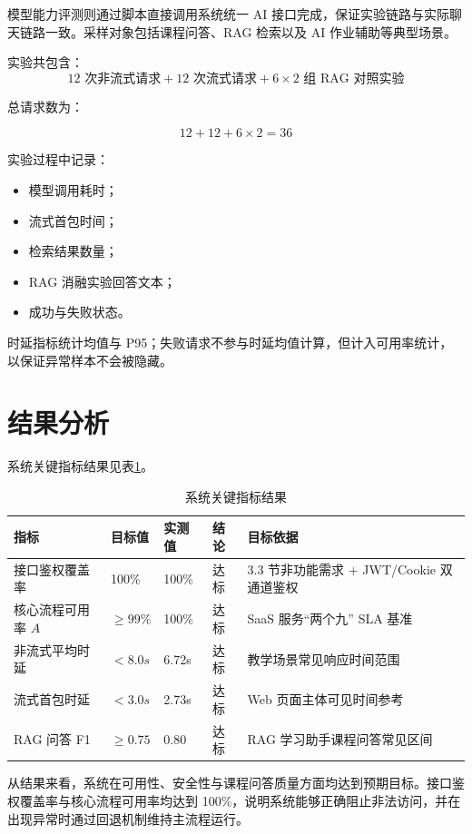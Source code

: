 \documentclass[12pt,a4paper,oneside]{ctexbook}
\numberwithin{equation}{chapter}
\begin{document}
模型能力评测则通过脚本直接调用系统统一 AI 接口完成，保证实验链路与实际聊天链路一致。采样对象包括课程问答、RAG 检索以及 AI 作业辅助等典型场景。

实验共包含：
\[
12 \text{ 次非流式请求} +
12 \text{ 次流式请求} +
6\times2 \text{ 组 RAG 对照实验}
\]

总请求数为：

\[
12+12+6\times2=36
\]

实验过程中记录：
\begin{itemize}
  \item 模型调用耗时；
  \item 流式首包时间；
  \item 检索结果数量；
  \item RAG 消融实验回答文本；
  \item 成功与失败状态。
\end{itemize}

时延指标统计均值与 P95；失败请求不参与时延均值计算，但计入可用率统计，以保证异常样本不会被隐藏。

\section{结果分析}

系统关键指标结果见表\ref{tab:metricsResult}。

\begin{table}[H]
  \centering
  \caption{系统关键指标结果}
  \label{tab:metricsResult}
  \begin{tabular}{p{3.5cm}p{1.5cm}p{1.2cm}p{1.2cm}p{6.5cm}}
    \toprule
    指标 & 目标值 & 实测值 & 结论 & 目标依据 \\
    \midrule
    接口鉴权覆盖率 & 100\% & 100\% & 达标 & 3.3 节非功能需求 + JWT/Cookie 双通道鉴权 \\
    核心流程可用率 $A$ & $\ge 99\%$ & 100\% & 达标 & SaaS 服务“两个九” SLA 基准 \\
    非流式平均时延 & $<8.0s$ & 6.72s & 达标 & 教学场景常见响应时间范围 \\
    流式首包时延 & $<3.0s$ & 2.73s & 达标 & Web 页面主体可见时间参考 \\
    RAG 问答 F1 & $\ge 0.75$ & 0.80 & 达标 & RAG 学习助手课程问答常见区间 \\
    \bottomrule
  \end{tabular}
\end{table}

从结果来看，系统在可用性、安全性与课程问答质量方面均达到预期目标。接口鉴权覆盖率与核心流程可用率均达到 100\%，说明系统能够正确阻止非法访问，并在出现异常时通过回退机制维持主流程运行。
\end{document}

